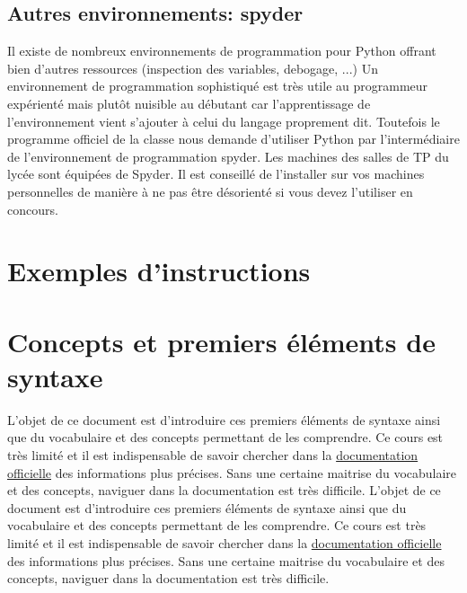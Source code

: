 \subsection{Autres environnements: spyder}
Il existe de nombreux environnements de programmation pour Python offrant bien d'autres ressources (inspection des variables, debogage, ...) Un environnement de programmation sophistiqué est très utile au programmeur expérienté mais plutôt nuisible au débutant car l'apprentissage de l'environnement vient s'ajouter à celui du langage proprement dit.\newline
Toutefois le programme officiel de la classe nous demande d'utiliser Python par l'intermédiaire de l'environnement de programmation spyder. Les machines des salles de TP du lycée sont équipées de Spyder. Il est conseillé de l'installer sur vos machines personnelles de manière à ne pas être désorienté si vous devez l'utiliser en concours. 



\section{Exemples d'instructions}



\section{Concepts et premiers éléments de syntaxe}
L'objet de ce document est d'introduire ces premiers éléments de syntaxe ainsi que du vocabulaire et des concepts permettant de les comprendre. Ce cours est très limité et il est indispensable de savoir chercher dans la \href{http://docs.python.org/3.3/reference/}{documentation officielle} des informations plus précises. Sans une certaine maitrise du vocabulaire et des concepts, naviguer dans la documentation est très difficile.
L'objet de ce document est d'introduire ces premiers éléments de syntaxe ainsi que du vocabulaire et des concepts permettant de les comprendre. Ce cours est très limité et il est indispensable de savoir chercher dans la \href{http://docs.python.org/3.3/reference/}{documentation officielle} des informations plus précises. Sans une certaine maitrise du vocabulaire et des concepts, naviguer dans la documentation est très difficile.
